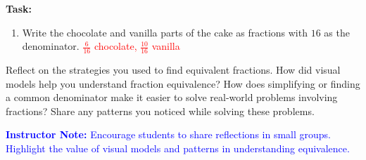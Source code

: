 \documentclass[12pt]{article}
\begin{document}
\vspace{1em}

\begin{tcolorbox}[colframe=black!60, colback=white, 
coltitle=black, colbacktitle=black!15, fonttitle=\bfseries\Large, 
title=Performance Task: Sharing a Cake, halign title=center, left=10pt, right=10pt, top=10pt, bottom=50pt]
\textbf{Task:}
\begin{enumerate}[itemsep=3em]
    \item Write the chocolate and vanilla parts of the cake as fractions with \( 16 \) as the denominator. \textcolor{red}{\( \frac{6}{16} \) chocolate, \( \frac{10}{16} \) vanilla}
\end{enumerate}
\end{tcolorbox}

\vspace{1em}

\begin{tcolorbox}[colframe=black!60, colback=white, 
coltitle=black, colbacktitle=black!15, fonttitle=\bfseries\Large, 
title=Reflection, halign title=center, left=10pt, right=10pt, top=10pt, bottom=80pt]
Reflect on the strategies you used to find equivalent fractions. How did visual models help you understand fraction equivalence? How does simplifying or finding a common denominator make it easier to solve real-world problems involving fractions? Share any patterns you noticed while solving these problems.

\textcolor{blue}{\textbf{Instructor Note:} Encourage students to share reflections in small groups. Highlight the value of visual models and patterns in understanding equivalence.}
\end{tcolorbox}
\end{document}
